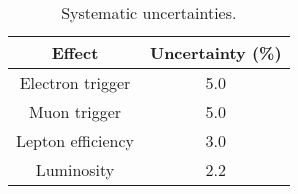 \begin{table}
    \centering
\begin{tabular}{cc}
    \toprule
          Effect & Uncertainty (\%) \\
          \midrule
  Electron trigger          & 5.0 \\
  Muon trigger              & 5.0 \\
  Lepton efficiency         & 3.0 \\
  Luminosity                & 2.2 \\
  \bottomrule
\end{tabular}
\caption{Systematic uncertainties.}
\end{table}
